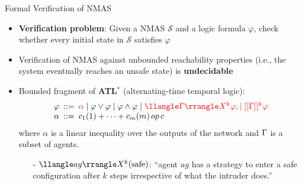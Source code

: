\documentclass[10pt]{beamer}
\newcommand\blfootnote[1]{%
  \begingroup
  \renewcommand\thefootnote{}\footnote{#1}%
  \addtocounter{footnote}{-1}%
  \endgroup
}
\begin{document}
\begin{frame}{Formal Verification of NMAS}

\begin{itemize} \itemsep 1.5em
    \item {\bf Verification problem}: Given a NMAS $\mathcal S$ and a logic formula 
	   $\varphi$, check whether every initial state in $\mathcal S$ satisfies $\varphi$
    \item  Verification of NMAS against unbounded reachability properties
        (i.e., the system eventually reaches an unsafe state) is
        {\bf undecidable}
    \item Bounded fragment of {\bf ATL$^*$} (alternating-time temporal logic):
  \[\begin{array}{rcl} \varphi \! \! \!  & ::= \!  \!  \!
      & \red{\alpha} \mid \varphi \lor \varphi \mid \varphi \land \varphi \mid
	  \red{\egamma{k} \varphi, \mid [[\Gamma]]^k \varphi} %
      \\
      \alpha \! \! \!  & ::= \!  \!  \!
      & c_1(1)+\cdots+c_m(m) \op c
    \end{array}\]
    where $\alpha$ is a linear inequality over the outputs of the network and 
    $\Gamma$ is a subset of agents.
        \vspace{1em}

        \begin{itemize}
            \item[\textcolor{black}{-}] $\egamma[ag]{k} (\text{safe})$: ``agent
                $ag$ has a strategy to enter a safe configuration after $k$
                steps irrespective of what the intruder does.''
        \end{itemize}
    \end{itemize}



\end{frame}


\end{document}
